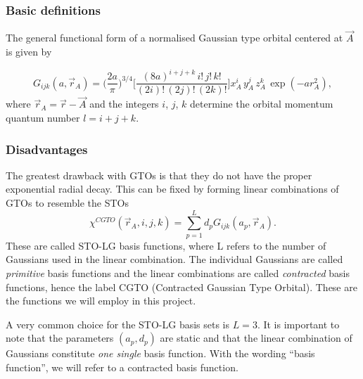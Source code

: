 \documentclass{beamer}
\begin{document}
\begin{frame}
\frametitle{Basic definitions}

\begin{block}{}

The general functional form of a normalised Gaussian type orbital 
centered at $\vec A$ is given by

\begin{equation}
 G_{ijk}(a, \vec r_A) = \Big(\frac{2a}{\pi}\Big)^{3/4}\Big[\frac{(8a)^{i+j+k}\,i!\,j!\,k!}{(2i)!\,(2j)!\,(2k)!}\Big]x_A^i\,y_A^j\,z_A^k\,\exp(-a r_A^2),
\end{equation}
where $\vec r_A = \vec r - \vec A$ and the integers $i$, $j$, $k$ determine the orbital momentum quantum number $l=i+j+k$. 
\end{block}
\end{frame}

\begin{frame}
\frametitle{Disadvantages}

\begin{block}{}

The greatest drawback with GTOs is that they do not have the proper exponential radial decay. This can be fixed by forming linear combinations of GTOs
to resemble the STOs
\begin{equation}
 \chi^{CGTO}(\vec r_A,i,j,k) = \sum_{p=1}^L d_p G_{ijk}(a_p, \vec r_A).
\end{equation}
These are called STO-LG basis functions, where L refers to the number of Gaussians used in the linear combination.
The individual Gaussians are called \emph{primitive} basis functions and the linear combinations are called \emph{contracted} basis functions, hence the label
CGTO (Contracted Gaussian Type Orbital). These are the functions we will employ in this project.

A very common choice for the STO-LG basis sets is $L=3$. 
It is important to note that the parameters $(a_p,d_p)$ are static and that the linear combination of Gaussians constitute \emph{one single}
basis function. With the wording ``basis function'', we  will refer to a contracted basis function.
\end{block}
\end{frame}
\end{document}
